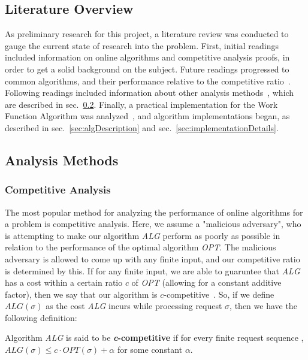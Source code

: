 \subsection{Literature Overview}
\label{sec:lit}
As preliminary research for this project, a literature review was conducted to gauge the current state of research into the \KS problem. First, initial readings included information on online algorithms and competitive analysis proofs, in order to get a solid background on the subject. Future readings progressed to common \KS algorithms, and their performance relative to the competitive ratio~\cite{OnlineComp1998}. Following readings included information about other analysis methods~\cite{MAXMAX2005, bij2016}, which are described in sec.~\ref{sec:AM}. Finally, a practical implementation for the Work Function Algorithm was analyzed~\cite{WFA2009}, and algorithm implementations began, as described in sec.~\ref{sec:algDescription} and sec.~\ref{sec:implementationDetails}.


\subsection{Analysis Methods}
\label{sec:AM}

\subsubsection*{Competitive Analysis}
\label{sec:Comp}
The most popular method for analyzing the performance of online algorithms for a problem is competitive analysis. Here, we assume a "malicious adversary", who is attempting to make our algorithm \textit{ALG} perform as poorly as possible in relation to the performance of the optimal algorithm \textit{OPT}. The malicious adversary is allowed to come up with any finite input, and our competitive ratio is determined by this. If for any finite input, we are able to guaruntee that \textit{ALG} has a cost within a certain ratio $c$ of \textit{OPT} (allowing for a constant additive factor), then we say that our algorithm is $c$-competitive~\cite{OnlineComp1998}. So, if we define $ALG(\sigma)$ as the cost \textit{ALG} incurs while processing request $\sigma$, then we have the following definition: 

\begin{definition}
\label{def:comp}
Algorithm \textit{ALG} is said to be \textbf{\textit{c}-competitive} if for every finite request sequence \s, $ALG(\sigma) \leq c\cdot OPT(\sigma)+\alpha$ for some constant $\alpha$.
\end{definition}

